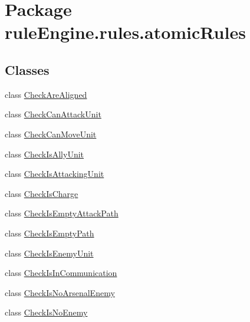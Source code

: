 \hypertarget{namespacerule_engine_1_1rules_1_1atomic_rules}{}\section{Package rule\+Engine.\+rules.\+atomic\+Rules}
\label{namespacerule_engine_1_1rules_1_1atomic_rules}
\subsection*{Classes}
\begin{DoxyCompactItemize}
\item 
class \mbox{\hyperlink{classrule_engine_1_1rules_1_1atomic_rules_1_1_check_are_aligned}{Check\+Are\+Aligned}}
\item 
class \mbox{\hyperlink{classrule_engine_1_1rules_1_1atomic_rules_1_1_check_can_attack_unit}{Check\+Can\+Attack\+Unit}}
\item 
class \mbox{\hyperlink{classrule_engine_1_1rules_1_1atomic_rules_1_1_check_can_move_unit}{Check\+Can\+Move\+Unit}}
\item 
class \mbox{\hyperlink{classrule_engine_1_1rules_1_1atomic_rules_1_1_check_is_ally_unit}{Check\+Is\+Ally\+Unit}}
\item 
class \mbox{\hyperlink{classrule_engine_1_1rules_1_1atomic_rules_1_1_check_is_attacking_unit}{Check\+Is\+Attacking\+Unit}}
\item 
class \mbox{\hyperlink{classrule_engine_1_1rules_1_1atomic_rules_1_1_check_is_charge}{Check\+Is\+Charge}}
\item 
class \mbox{\hyperlink{classrule_engine_1_1rules_1_1atomic_rules_1_1_check_is_empty_attack_path}{Check\+Is\+Empty\+Attack\+Path}}
\item 
class \mbox{\hyperlink{classrule_engine_1_1rules_1_1atomic_rules_1_1_check_is_empty_path}{Check\+Is\+Empty\+Path}}
\item 
class \mbox{\hyperlink{classrule_engine_1_1rules_1_1atomic_rules_1_1_check_is_enemy_unit}{Check\+Is\+Enemy\+Unit}}
\item 
class \mbox{\hyperlink{classrule_engine_1_1rules_1_1atomic_rules_1_1_check_is_in_communication}{Check\+Is\+In\+Communication}}
\item 
class \mbox{\hyperlink{classrule_engine_1_1rules_1_1atomic_rules_1_1_check_is_no_arsenal_enemy}{Check\+Is\+No\+Arsenal\+Enemy}}
\item 
class \mbox{\hyperlink{classrule_engine_1_1rules_1_1atomic_rules_1_1_check_is_no_enemy}{Check\+Is\+No\+Enemy}}

\end{DoxyCompactItemize}
